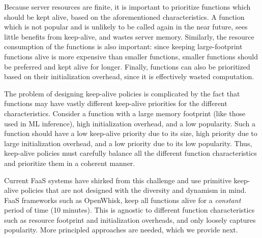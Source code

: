 Because server resources are finite, it is important to prioritize functions which should be kept alive, based on the aforementioned characteristics. 
A function which is not popular and is unlikely to be called again in the near future, sees little benefits from keep-alive, and wastes server memory. 
Similarly, the resource consumption of the functions is also important: since keeping large-footprint functions alive is more expensive than smaller functions, smaller functions should be preferred and kept alive for longer. 
Finally, functions can also be prioritized based on their initialization overhead, since it is effectively wasted computation.

The problem of designing keep-alive policies is complicated by the fact that functions may have vastly different keep-alive priorities for the different characteristics.
Consider a function with a large memory footprint (like those used in ML inference), high initialization overhead, and a low popularity.
Such a function should have a low keep-alive priority due to its size, high priority due to large initialization overhead, and a low priority due to its low popularity.
Thus, keep-alive policies must carefully balance all the different function characteristics and prioritize them in a coherent manner. 


Current FaaS systems have shirked from this challenge and use primitive keep-alive policies that are not designed with the diversity and dynamism in mind. 
FaaS frameworks such as OpenWhisk, keep all functions alive for a \emph{constant} period of time (10 minutes). 
This is agnostic to different function characteristics such as resource footprint and initialization overheads, and only loosely captures popularity. 
More principled approaches are needed, which we provide next. 



